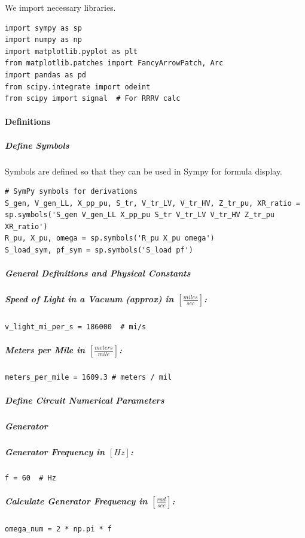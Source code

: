 We import necessary libraries.

\begin{verbatim}
import sympy as sp
import numpy as np
import matplotlib.pyplot as plt
from matplotlib.patches import FancyArrowPatch, Arc
import pandas as pd
from scipy.integrate import odeint
from scipy import signal  # For RRRV calc
\end{verbatim}

\paragraph{Definitions}

\subparagraph{Define Symbols}

Symbols are defined so that they can be used in Sympy for formula display.

\begin{verbatim}
# SymPy symbols for derivations
S_gen, V_gen_LL, X_pp_pu, S_tr, V_tr_LV, V_tr_HV, Z_tr_pu, XR_ratio = sp.symbols('S_gen V_gen_LL X_pp_pu S_tr V_tr_LV V_tr_HV Z_tr_pu XR_ratio')
R_pu, X_pu, omega = sp.symbols('R_pu X_pu omega')
S_load_sym, pf_sym = sp.symbols('S_load pf')
\end{verbatim}

\subparagraph{General Definitions and Physical Constants}

\subparagraph{Speed of Light in a Vacuum (approx) in $\left[\frac{miles}{sec}\right]$:}

\begin{verbatim}
v_light_mi_per_s = 186000  # mi/s
\end{verbatim}

\subparagraph{Meters per Mile in $\left[\frac{meters}{mile}\right]$:}

\begin{verbatim}
meters_per_mile = 1609.3 # meters / mil
\end{verbatim}

\subparagraph{Define Circuit Numerical Parameters}

\subparagraph{Generator}

\subparagraph{Generator Frequency in $\left[Hz\right]$:}

\begin{verbatim}
f = 60  # Hz
\end{verbatim}

\subparagraph{Calculate Generator Frequency in $\left[\frac{rad}{sec}\right]$:}

\begin{verbatim}
omega_num = 2 * np.pi * f
\end{verbatim}

